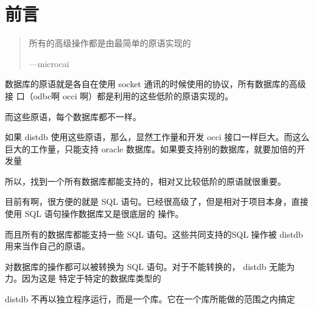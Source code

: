 \documentclass[12pt,a4papper]{report}
\newcommand{\code}[1]{  {\noindent\CODEFONT \mbox{#1}}  }
\begin{document}

\chapter*{前言}

\begin{quote}
所有的高级操作都是由最简单的原语实现的\\
\begin{flushright}
{\CODEFONT \mbox{---microcai}}
\end{flushright}
\end{quote}

数据库的原语就是各自在使用 socket 通讯的时候使用的协议，所有数据库的高级接
口（odbc啊 occi 啊）都是利用的这些低阶的原语实现的。

而这些原语，每个数据库都不一样。

如果 \code{distdb} 使用这些原语，那么，显然工作量和开发 occi 接口一样巨大。而这么巨大的工作量，只能支持\code{oracle}
数据库。如果要支持别的数据库，就要加倍的开发量

所以，找到一个所有数据库都能支持的，相对又比较低阶的原语就很重要。

目前有啊，很方便的就是 SQL 语句。已经很高级了，但是相对于项目本身，直接使用 SQL 语句操作数据库又是很底层的
操作。

而且所有的数据库都能支持一些 SQL 语句。这些共同支持的SQL 操作被 \code{distdb} 用来当作自己的原语。

对数据库的操作都可以被转换为 SQL 语句。对于不能转换的，\code{distdb} 无能为力。因为这是 特定于特定的数据库类型的


distdb 不再以独立程序运行，而是一个库。它在一个库所能做的范围之内搞定
\end{document}
